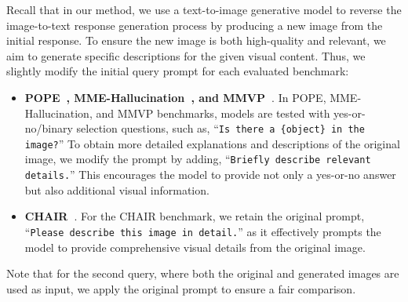 Recall that in our method, we use a text-to-image generative model to reverse the image-to-text response generation process by producing a new image from the initial response. To ensure the new image is both high-quality and relevant, we aim to generate specific descriptions for the given visual content. Thus, we slightly modify the initial query prompt for each evaluated benchmark: 
\begin{itemize}
    \item \textbf{POPE~\citep{li2023evaluating}, MME-Hallucination~\citep{fu2023mme}, and MMVP~\citep{tong2024eyes}}. In POPE, MME-Hallucination, and MMVP benchmarks, models are tested with yes-or-no/binary selection questions, such as, ``\texttt{Is there a \{object\} in the image?}'' To obtain more detailed explanations and descriptions of the original image, we modify the prompt by adding, ``\texttt{Briefly describe relevant details.}'' This encourages the model to provide not only a yes-or-no answer but also additional visual information.
    \item \textbf{CHAIR~\citep{rohrbach2018object}}. For the CHAIR benchmark, we retain the original prompt, ``\texttt{Please describe this image in detail.}'' as it effectively prompts the model to provide comprehensive visual details from the original image.
\end{itemize}
Note that for the second query, where both the original and generated images are used as input, we apply the original prompt to ensure a fair comparison.


